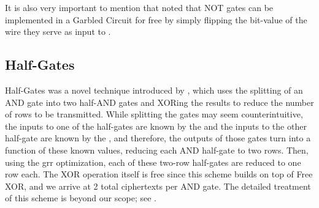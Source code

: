 It is also very important to mention that \citeauthor{ALP:KolSch08} noted that NOT gates can be implemented in a Garbled Circuit for free by simply flipping the bit-value of the wire they serve as input to \cite[Section 3.1]{ALP:KolSch08}.

\subsection{Half-Gates}
\label{subsec:halfgates}
Half-Gates was a novel technique introduced by \citeauthor{EC:ZahRosEva15} \cite{EC:ZahRosEva15}, which uses the splitting of an AND gate into two half-AND gates and XORing the results to reduce the number of rows to be transmitted. While splitting the gates may seem counterintuitive, the inputs to one of the half-gates are known by the \cgarbler and the inputs to the other half-gate are known by the \cevaluator, and therefore, the outputs of those gates turn into a function of these known values, reducing each AND half-gate to two rows. Then, using the \acrshort{grr} optimization, each of these two-row half-gates are reduced to one row each. The XOR operation itself is free since this scheme builds on top of Free XOR, and we arrive at 2 total ciphertexts per AND gate.
The detailed treatment of this scheme is beyond our scope; see \cite{EC:ZahRosEva15}.